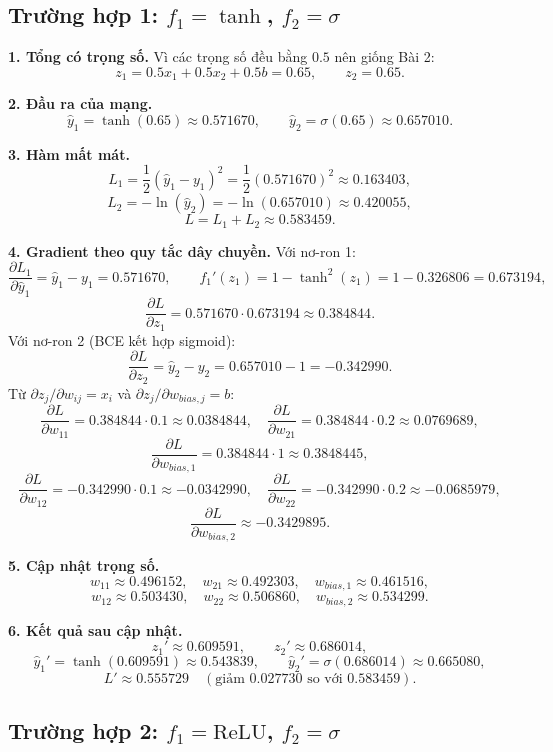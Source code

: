\documentclass[a4paper,12pt]{article}
\begin{document}
\subsection*{Trường hợp 1: $f_1 = \tanh$, $f_2 = \sigma$}

\textbf{1. Tổng có trọng số.} Vì các trọng số đều bằng $0.5$ nên giống Bài 2:
\[ z_1 = 0.5x_1 + 0.5x_2 + 0.5b = 0.65, \qquad z_2 = 0.65. \]

\textbf{2. Đầu ra của mạng.}
\[ \hat{y}_1 = \tanh(0.65) \approx 0.571670, \qquad
   \hat{y}_2 = \sigma(0.65) \approx 0.657010. \]

\textbf{3. Hàm mất mát.}
\[ L_1 = \frac{1}{2}(\hat{y}_1 - y_1)^2 = \frac{1}{2}(0.571670)^2 \approx 0.163403, \]
\[ L_2 = -\ln(\hat{y}_2) = -\ln(0.657010) \approx 0.420055, \]
\[ L = L_1 + L_2 \approx 0.583459. \]

\textbf{4. Gradient theo quy tắc dây chuyền.}
Với nơ-ron 1:
\[ \frac{\partial L_1}{\partial \hat{y}_1} = \hat{y}_1 - y_1 = 0.571670, \qquad
   f_1'(z_1) = 1 - \tanh^2(z_1) = 1 - 0.326806 = 0.673194, \]
\[ \frac{\partial L}{\partial z_1} = 0.571670\cdot 0.673194 \approx 0.384844. \]
Với nơ-ron 2 (BCE kết hợp sigmoid):
\[ \frac{\partial L}{\partial z_2} = \hat{y}_2 - y_2 = 0.657010 - 1 = -0.342990. \]
Từ $\partial z_j/\partial w_{ij} = x_i$ và $\partial z_j/\partial w_{bias,j} = b$:
\[ \frac{\partial L}{\partial w_{11}} = 0.384844\cdot 0.1 \approx 0.0384844, \quad
   \frac{\partial L}{\partial w_{21}} = 0.384844\cdot 0.2 \approx 0.0769689, \]
\[ \frac{\partial L}{\partial w_{bias,1}} = 0.384844\cdot 1 \approx 0.3848445, \]
\[ \frac{\partial L}{\partial w_{12}} = -0.342990\cdot 0.1 \approx -0.0342990, \quad
   \frac{\partial L}{\partial w_{22}} = -0.342990\cdot 0.2 \approx -0.0685979, \]
\[ \frac{\partial L}{\partial w_{bias,2}} \approx -0.3429895. \]

\textbf{5. Cập nhật trọng số.}
\[ w_{11} \approx 0.496152, \quad w_{21} \approx 0.492303, \quad w_{bias,1} \approx 0.461516, \]
\[ w_{12} \approx 0.503430, \quad w_{22} \approx 0.506860, \quad w_{bias,2} \approx 0.534299. \]

\textbf{6. Kết quả sau cập nhật.}
\[ z_1' \approx 0.609591, \qquad z_2' \approx 0.686014, \]
\[ \hat{y}_1' = \tanh(0.609591) \approx 0.543839, \qquad
   \hat{y}_2' = \sigma(0.686014) \approx 0.665080, \]
\[ L' \approx 0.555729 \quad (\text{giảm } 0.027730 \text{ so với } 0.583459). \]

\subsection*{Trường hợp 2: $f_1 = \mathrm{ReLU}$, $f_2 = \sigma$}
\end{document}
